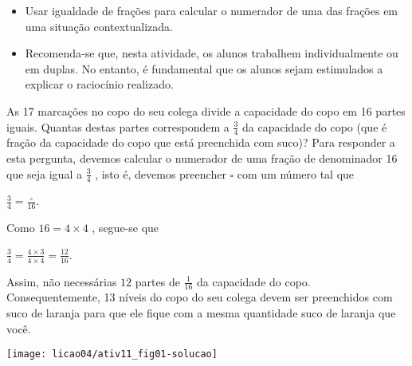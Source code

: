 \begin{atividade}\label{chap4-ativ11}
\objetivos
\begin{itemize} %
    \item       Usar igualdade de frações para calcular o numerador de uma das
frações em uma situação contextualizada.
\end{itemize} %

\discussoes
\begin{itemize} %
    \item       Recomenda-se que, nesta atividade, os alunos trabalhem
individualmente ou em duplas. No entanto, é fundamental que os alunos sejam
estimulados a explicar o raciocínio realizado.
\end{itemize} %

\solucao
  As 17 marcações no copo do seu colega divide a capacidade do copo em 16 partes
iguais. Quantas destas partes correspondem a   $\frac{3}{4}$   da capacidade do
copo (que é fração da capacidade do copo que está preenchida com suco)? Para
responder a esta pergunta, devemos calcular o numerador de uma fração de
denominador 16 que seja igual a   $\frac{3}{4}$  , isto é, devemos preencher
$\square$   com um número tal que

  $\frac{3}{4} = \frac{\square}{16}$.

  Como   $16 = 4 \times 4$  , segue-se que

  $\frac{3}{4} = \frac{4 \times 3}{4 \times 4} = \frac{12}{16}$.

  Assim, não necessárias   $12$   partes de   $\frac{1}{16}$   da capacidade do
copo. Consequentemente,
  13 níveis do copo do seu colega devem ser preenchidos com suco de laranja para
que ele fique com a mesma quantidade suco de laranja que você.


\begin{center}
\texttt{[image: licao04/ativ11\_fig01-solucao]}
\end{center}


\end{atividade}

\clearpage

